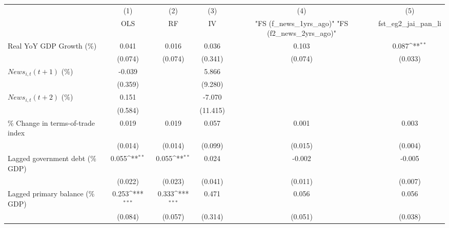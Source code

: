 {
\def\sym#1{\ifmmode^{#1}\else\(^{#1}\)\fi}
\begin{tabular}{l*{5}{c}}
\toprule
                    &\multicolumn{1}{c}{(1)}&\multicolumn{1}{c}{(2)}&\multicolumn{1}{c}{(3)}&\multicolumn{1}{c}{(4)}&\multicolumn{1}{c}{(5)}\\
                    &\multicolumn{1}{c}{OLS}&\multicolumn{1}{c}{RF}&\multicolumn{1}{c}{IV}&\multicolumn{1}{c}{ "FS (f_news_1yrs_ago)"  "FS (f2_news_2yrs_ago)" }&\multicolumn{1}{c}{fst_eg2_jai_pan_li}\\
\midrule
Real YoY GDP Growth (\%)&       0.041         &       0.016         &       0.036         &       0.103         &       0.087\sym{**} \\
                    &     (0.074)         &     (0.074)         &     (0.341)         &     (0.074)         &     (0.033)         \\
\addlinespace
$ News_{i,t}(t+1)$ (\%)&      -0.039         &                     &       5.866         &                     &                     \\
                    &     (0.359)         &                     &     (9.280)         &                     &                     \\
\addlinespace
$ News_{i,t}(t+2)$ (\%)&       0.151         &                     &      -7.070         &                     &                     \\
                    &     (0.584)         &                     &    (11.415)         &                     &                     \\
\addlinespace
\% Change in terms-of-trade index&       0.019         &       0.019         &       0.057         &       0.001         &       0.003         \\
                    &     (0.014)         &     (0.014)         &     (0.099)         &     (0.015)         &     (0.004)         \\
\addlinespace
Lagged government debt (\% GDP)&       0.055\sym{**} &       0.055\sym{**} &       0.024         &      -0.002         &      -0.005         \\
                    &     (0.022)         &     (0.023)         &     (0.041)         &     (0.011)         &     (0.007)         \\
\addlinespace
Lagged primary balance (\% GDP)&       0.253\sym{***}&       0.333\sym{***}&       0.471         &       0.056         &       0.056         \\
                    &     (0.084)         &     (0.057)         &     (0.314)         &     (0.051)         &     (0.038)         \\

\end{tabular}}
